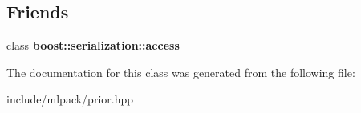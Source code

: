 \subsection*{Friends}
\begin{DoxyCompactItemize}
\item 
\hypertarget{classmlpack_1_1_uniform_prior_ac98d07dd8f7b70e16ccb9a01abf56b9c}{
class {\bfseries boost::serialization::access}}
\label{classmlpack_1_1_uniform_prior_ac98d07dd8f7b70e16ccb9a01abf56b9c}

\end{DoxyCompactItemize}


The documentation for this class was generated from the following file:\begin{DoxyCompactItemize}
\item 
include/mlpack/prior.hpp\end{DoxyCompactItemize}
